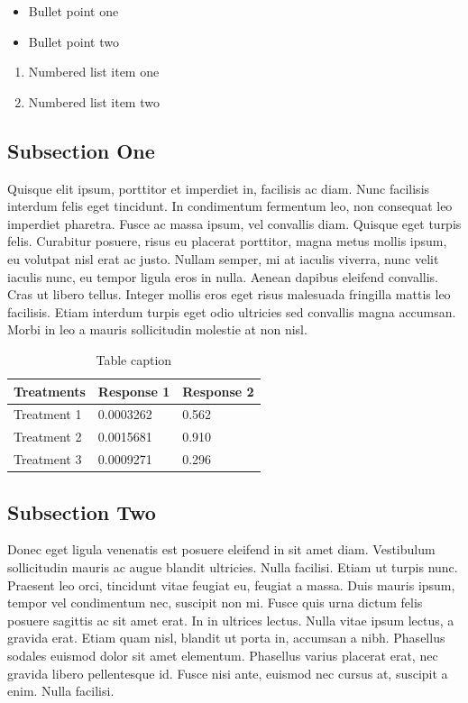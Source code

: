 \documentclass[preprint,12pt]{elsarticle}
\begin{document}
\begin{itemize}
\item Bullet point one
\item Bullet point two
\end{itemize}

\begin{enumerate}
\item Numbered list item one
\item Numbered list item two
\end{enumerate}

\subsection{Subsection One}

Quisque elit ipsum, porttitor et imperdiet in, facilisis ac diam. Nunc facilisis interdum felis eget tincidunt. In condimentum fermentum leo, non consequat leo imperdiet pharetra. Fusce ac massa ipsum, vel convallis diam. Quisque eget turpis felis. Curabitur posuere, risus eu placerat porttitor, magna metus mollis ipsum, eu volutpat nisl erat ac justo. Nullam semper, mi at iaculis viverra, nunc velit iaculis nunc, eu tempor ligula eros in nulla. Aenean dapibus eleifend convallis. Cras ut libero tellus. Integer mollis eros eget risus malesuada fringilla mattis leo facilisis. Etiam interdum turpis eget odio ultricies sed convallis magna accumsan. Morbi in leo a mauris sollicitudin molestie at non nisl.

\begin{table}[h]
\centering
\begin{tabular}{l l l}
\hline
\textbf{Treatments} & \textbf{Response 1} & \textbf{Response 2}\\
\hline
Treatment 1 & 0.0003262 & 0.562 \\
Treatment 2 & 0.0015681 & 0.910 \\
Treatment 3 & 0.0009271 & 0.296 \\
\hline
\end{tabular}
\caption{Table caption}
\end{table}

\subsection{Subsection Two}

Donec eget ligula venenatis est posuere eleifend in sit amet diam. Vestibulum sollicitudin mauris ac augue blandit ultricies. Nulla facilisi. Etiam ut turpis nunc. Praesent leo orci, tincidunt vitae feugiat eu, feugiat a massa. Duis mauris ipsum, tempor vel condimentum nec, suscipit non mi. Fusce quis urna dictum felis posuere sagittis ac sit amet erat. In in ultrices lectus. Nulla vitae ipsum lectus, a gravida erat. Etiam quam nisl, blandit ut porta in, accumsan a nibh. Phasellus sodales euismod dolor sit amet elementum. Phasellus varius placerat erat, nec gravida libero pellentesque id. Fusce nisi ante, euismod nec cursus at, suscipit a enim. Nulla facilisi.
\end{document}

